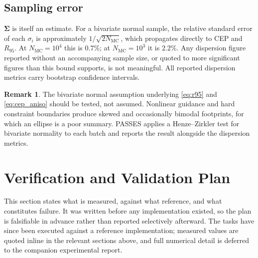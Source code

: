 \documentclass[11pt,a4paper]{article}
\theoremstyle{definition}
\newtheorem{remark}[theorem]{Remark}
\numberwithin{equation}{section}
\begin{document}
\subsection{Sampling error}

$\bm{\Sigma}$ is itself an estimate. For a bivariate normal sample, the relative standard error of each $\sigma_i$ is approximately $1/\sqrt{2N_{\text{MC}}}$, which propagates directly to CEP and $R_{95}$. At $N_{\text{MC}} = 10^4$ this is $0.7\%$; at $N_{\text{MC}} = 10^3$ it is $2.2\%$. Any dispersion figure reported without an accompanying sample size, or quoted to more significant figures than this bound supports, is not meaningful. All reported dispersion metrics carry bootstrap confidence intervals.

\begin{remark}
The bivariate normal assumption underlying \cref{eq:r95} and \cref{eq:cep_aniso} should be tested, not assumed. Nonlinear guidance and hard constraint boundaries produce skewed and occasionally bimodal footprints, for which an ellipse is a poor summary. PASSES applies a Henze--Zirkler test for bivariate normality to each batch and reports the result alongside the dispersion metrics.
\end{remark}

\section{Verification and Validation Plan}
\label{sec:vandv}

This section states what is measured, against what reference, and what constitutes failure. It was written before any implementation existed, so the plan is falsifiable in advance rather than reported selectively afterward. The tasks have since been executed against a reference implementation; measured values are quoted inline in the relevant sections above, and full numerical detail is deferred to the companion experimental report.
\end{document}
